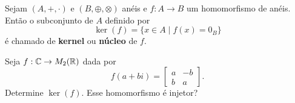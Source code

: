 \begin{definicao}
	Sejam $(A, +, \cdot)$ e $(B, \oplus, \otimes)$ an\'eis e $f : A \to B$ um homomorfismo de an\'eis. Ent\~ao o subconjunto de $A$ definido por
	\[
		\ker(f) = \{ x \in A \mid f(x) = 0_B\}
	\]
	\'e chamado de \textbf{kernel} ou \textbf{n\'ucleo} de $f$.
\end{definicao}

\begin{exemplo}
    Seja $f : \mathbb{C} \to M_2(\mathbb{R})$ dada por
    \[
        f(a + bi) = \begin{bmatrix}
            a & -b\\
            b & a
        \end{bmatrix}.
    \]
    Determine $\ker(f)$. Esse homomorfismo é injetor?
\end{exemplo}

